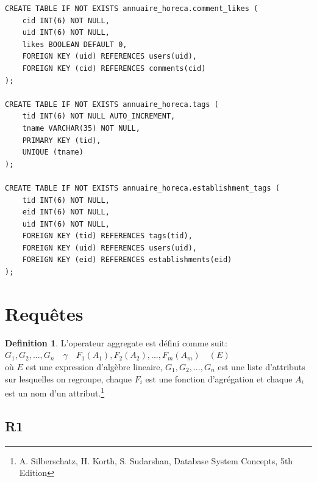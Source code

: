 \documentclass[11pt,a4paper]{report}
\begin{document}
\begin{verbatim}
CREATE TABLE IF NOT EXISTS annuaire_horeca.comment_likes (
    cid INT(6) NOT NULL,
    uid INT(6) NOT NULL,
    likes BOOLEAN DEFAULT 0,
    FOREIGN KEY (uid) REFERENCES users(uid),
    FOREIGN KEY (cid) REFERENCES comments(cid)
);

CREATE TABLE IF NOT EXISTS annuaire_horeca.tags (
    tid INT(6) NOT NULL AUTO_INCREMENT,
    tname VARCHAR(35) NOT NULL,
    PRIMARY KEY (tid),
    UNIQUE (tname)
);

CREATE TABLE IF NOT EXISTS annuaire_horeca.establishment_tags (
    tid INT(6) NOT NULL,
    eid INT(6) NOT NULL,
    uid INT(6) NOT NULL,
    FOREIGN KEY (tid) REFERENCES tags(tid),
    FOREIGN KEY (uid) REFERENCES users(uid),
    FOREIGN KEY (eid) REFERENCES establishments(eid)
);
\end{verbatim}

\section*{Requêtes}
\theoremstyle{plain}
\newtheorem{thm}{Theorem}
\theoremstyle{definition}
\newtheorem{defn}[thm]{Definition}

\begin{defn} L'operateur aggregate est défini comme suit: \\
\begin{math}G_1, G_2, ..., G_n \quad \gamma \quad F_1(A_1), F_2(A_2), ..., F_m(A_m) \quad (E) \end{math} \\
où \begin{math} E \end{math} est une expression d'algèbre lineaire,  \begin{math}G_1, G_2, ..., G_n \end{math} est une liste d'attributs sur lesquelles on regroupe, chaque \begin{math} F_i \end{math} est une fonction d'agrégation et chaque \begin{math} A_i \end{math} est un nom d'un attribut.\footnote{A. Silberschatz, H. Korth, S. Sudarshan, Database System Concepts, 5th Edition} \end{defn} 
\subsection*{R1}
\end{document}
